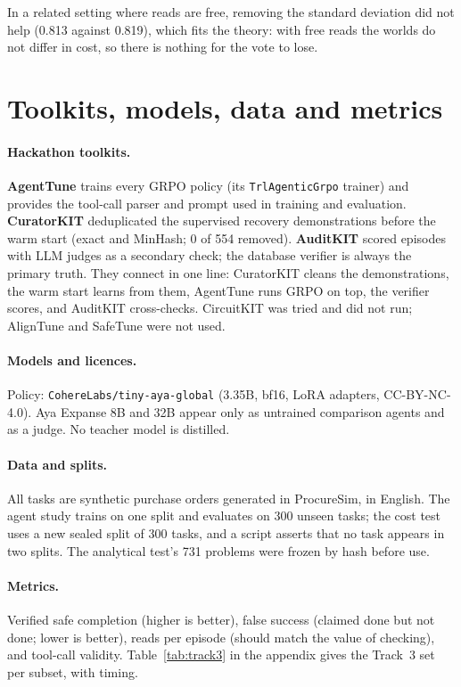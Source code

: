 \documentclass[11pt]{article}
\begin{document}
In a related setting where reads are free, removing the standard
deviation did not help (0.813 against 0.819), which fits the theory: with free reads the worlds do not differ in
cost, so there is nothing for the vote to lose.

\section{Toolkits, models, data and metrics}\label{sec:kits}
\paragraph{Hackathon toolkits.} \textbf{AgentTune} \citep{lyngkhoi2026agenttuneunifiedtraininglifecycle} trains every
GRPO policy (its \texttt{TrlAgenticGrpo} trainer) and provides the tool-call parser and prompt used in training and
evaluation. \textbf{CuratorKIT} \citep{bhattacharjee2026curatorkitdatacuration} deduplicated the supervised recovery
demonstrations before the warm start (exact and MinHash; 0 of 554 removed). \textbf{AuditKIT}
\citep{arora2026auditkitunifiedevaluationspine} scored episodes with LLM judges as a secondary check; the database
verifier is always the primary truth. They connect in one line: CuratorKIT cleans the demonstrations, the warm start
learns from them, AgentTune runs GRPO on top, the verifier scores, and AuditKIT cross-checks. CircuitKIT was tried
and did not run; AlignTune and SafeTune were not used.

\paragraph{Models and licences.} Policy: \texttt{CohereLabs/tiny-aya-global} (3.35B, bf16, LoRA adapters,
CC-BY-NC-4.0). Aya Expanse 8B and 32B \citep{dang2024ayaexpansecombiningresearch} appear only as untrained comparison
agents and as a judge. No teacher model is distilled.

\paragraph{Data and splits.} All tasks are synthetic purchase orders generated in ProcureSim, in English. The agent
study trains on one split and evaluates on 300 unseen tasks; the cost test uses a new sealed split of 300 tasks, and a
script asserts that no task appears in two splits. The analytical test's 731 problems were frozen by hash before use.

\paragraph{Metrics.} Verified safe completion (higher is better), false success (claimed done but not done; lower is
better), reads per episode (should match the value of checking), and tool-call validity. Table~\ref{tab:track3} in
the appendix gives the Track~3 set per subset, with timing.
\end{document}
